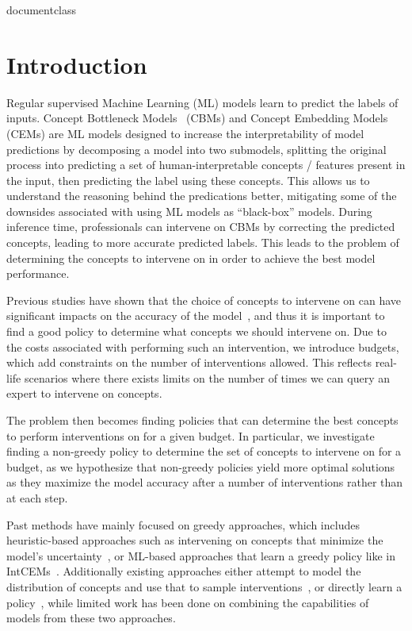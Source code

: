 \csname documentclass

\chapter{Introduction}
\label{firstcontentpage}


Regular supervised Machine Learning (ML) models learn to 
predict the labels of inputs.
Concept Bottleneck Models~\cite{cbm} (CBMs) and Concept Embedding Models~\cite{cem} (CEMs) are 
ML models designed to increase the interpretability of model predictions by decomposing a model into
two submodels, splitting the original process into predicting a set of human-interpretable
concepts / features present in the input, then predicting the label using these concepts.
This allows us to understand the reasoning behind the predications better, 
mitigating some of the downsides associated with using ML models as ``black-box'' models.
During inference time, professionals can intervene on CBMs by correcting
the predicted concepts, leading to more accurate predicted labels. 
This leads to the problem of determining the concepts to intervene on in order
to achieve the best model performance.

Previous studies have shown that the choice of concepts to 
intervene on can have significant impacts on the accuracy of the model~\cite{coop, intcem},
and thus it is important to find a good policy to determine what concepts
we should intervene on.
Due to the costs
associated with performing such an intervention, we introduce budgets,
which add constraints on the number of interventions allowed. 
This
reflects real-life scenarios where
there exists limits on the number of times we 
can query an expert to intervene on concepts.

The problem then becomes finding policies that can determine the best 
concepts to perform interventions on for a given budget. In particular,
we investigate finding a non-greedy policy to determine
the set of concepts to intervene on for a budget,
as we hypothesize that non-greedy policies
yield more optimal solutions as they maximize 
the model accuracy after a number of interventions rather than at each step.

Past methods have mainly focused on greedy approaches, which
includes heuristic-based approaches such as intervening on concepts that minimize the
model's uncertainty~\cite{coop}, or ML-based approaches that learn a greedy policy
like in IntCEMs~\cite{intcem}. Additionally existing approaches either 
attempt to model the distribution of concepts and use that
to sample interventions~\cite{energycem}, 
or directly learn a policy~\cite{intcem}, while limited
work has been done on combining the capabilities of models 
from these two approaches.

